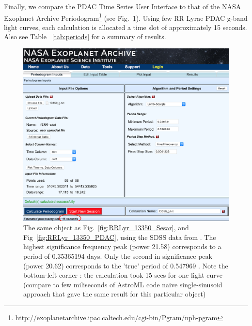\documentclass[DM,lsstdraft,toc,usenatbib]{lsstdoc}
\begin{document}
Finally, we compare the PDAC Time Series User Interface to that of the  NASA Exoplanet Archive Periodogram\footnote{http://exoplanetarchive.ipac.caltech.edu/cgi-bin/Pgram/nph-pgram} (see Fig.~\ref{fig:exoplanet_archive}). Using few RR Lyrae PDAC g-band  light curves, each calculation is allocated a time slot of approximately 15 seconds. Also see Table ~\ref{tab:periods} for a summary of results. 

\begin{figure}
\includegraphics[width=\textwidth]{figs/Exoplanet_archive_periodogram}
\caption{ The same object as Fig.~\ref{fig:RRLyr_13350_Sesar}, and Fig~\ref{fig:RRLyr_13350_PDAC},  using  the SDSS data from \citep{sesar2010}.  The highest significance frequency peak (power 21.58) corresponds to  a period of 0.35365194 days. Only the second in significance peak (power 20.62) corresponds to the 'true' period of 0.547969 \citep{sesar2010}. Note the bottom-left corner : the calculation took 15 secs for one light curve (compare to few miliseconds of AstroML code naive single-sinusoid approach that gave the same result for this particular object) }
\label{fig:exoplanet_archive}
\end{figure}



\end{document}
